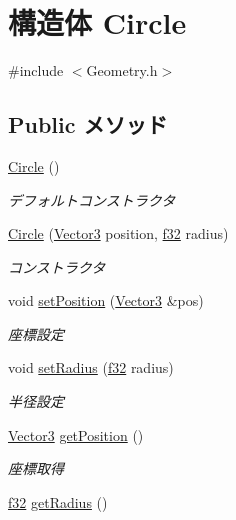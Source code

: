 \hypertarget{struct_circle}{\section{構造体 Circle}
\label{struct_circle}
}


{\ttfamily \#include $<$Geometry.\-h$>$}

\subsection*{Public メソッド}
\begin{DoxyCompactItemize}
\item 
\hyperlink{struct_circle_ad1ecfcfc7bf34529c6a6d6c448bf70fe}{Circle} ()
\begin{DoxyCompactList}\small\item\em デフォルトコンストラクタ \end{DoxyCompactList}\item 
\hyperlink{struct_circle_ac393b2eec2d71ac317dc783365105ccd}{Circle} (\hyperlink{struct_vector3}{Vector3} position, \hyperlink{_main_8h_a5f6906312a689f27d70e9d086649d3fd}{f32} radius)
\begin{DoxyCompactList}\small\item\em コンストラクタ \end{DoxyCompactList}\item 
void \hyperlink{struct_circle_a4b023e581d7b41af1349c6f4c6460491}{set\-Position} (\hyperlink{struct_vector3}{Vector3} \&pos)
\begin{DoxyCompactList}\small\item\em 座標設定 \end{DoxyCompactList}\item 
void \hyperlink{struct_circle_a88f85e090f6fdbdbaa96c1e3a32849ec}{set\-Radius} (\hyperlink{_main_8h_a5f6906312a689f27d70e9d086649d3fd}{f32} radius)
\begin{DoxyCompactList}\small\item\em 半径設定 \end{DoxyCompactList}\item 
\hyperlink{struct_vector3}{Vector3} \hyperlink{struct_circle_a0341f55bea7bfdd478293aa1eb370354}{get\-Position} ()
\begin{DoxyCompactList}\small\item\em 座標取得 \end{DoxyCompactList}\item 
\hyperlink{_main_8h_a5f6906312a689f27d70e9d086649d3fd}{f32} \hyperlink{struct_circle_a11b296c081d56bfdbd13a196e6a6faa0}{get\-Radius} ()

\end{DoxyCompactItemize}
